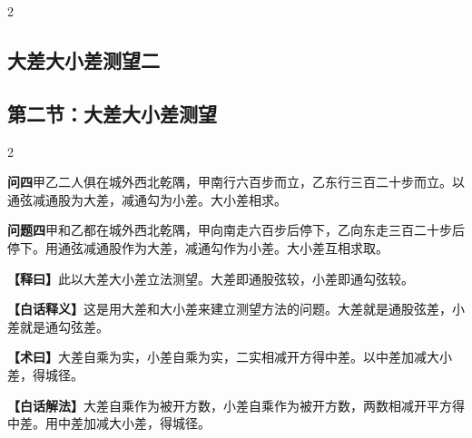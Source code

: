 \documentclass[11pt,a4paper]{article}
\newcommand{\WenQuestion}[1]{\textbf{\textcolor{classicalcolor}{#1}}}
\newcommand{\BaiQuestion}[1]{\textbf{\textcolor{moderncolor}{#1}}}
\newcommand{\WenExplain}{\textcolor{classicalcolor}{\textbf{【释曰】}}}
\newcommand{\BaiExplain}{\textcolor{moderncolor}{\textbf{【白话释义】}}}
\newcommand{\WenMethod}{\textcolor{classicalcolor}{\textbf{【术曰】}}}
\newcommand{\BaiMethod}{\textcolor{moderncolor}{\textbf{【白话解法】}}}
\begin{document}
\vspace{0.5em}

\begin{paracol}{2}
\subsection*{\textcolor{sectioncolor}{大差大小差测望二}}
\switchcolumn
\subsection*{\textcolor{sectioncolor}{第二节：大差大小差测望}}
\end{paracol}

\vspace{0.5em}

\begin{paracol}{2}

\switchcolumn*
\begin{tcolorbox}[colback=red!3,colframe=red!30!black,boxrule=0.3pt]
\WenQuestion{问四}\quad 甲乙二人俱在城外西北乾隅，甲南行六百步而立，乙东行三百二十步而立。以通弦减通股为大差，减通勾为小差。大小差相求。
\end{tcolorbox}
\switchcolumn
\begin{tcolorbox}[colback=blue!3,colframe=blue!30!black,boxrule=0.3pt]
\BaiQuestion{问题四}\quad 甲和乙都在城外西北乾隅，甲向南走六百步后停下，乙向东走三百二十步后停下。用通弦减通股作为大差，减通勾作为小差。大小差互相求取。
\end{tcolorbox}

\switchcolumn*
\begin{tcolorbox}[colback=red!5,colframe=red!30!black,boxrule=0.3pt]
\WenExplain\quad 此以大差大小差立法测望。大差即通股弦较，小差即通勾弦较。
\end{tcolorbox}
\switchcolumn
\begin{tcolorbox}[colback=blue!5,colframe=blue!30!black,boxrule=0.3pt]
\BaiExplain\quad 这是用大差和大小差来建立测望方法的问题。大差就是通股弦差，小差就是通勾弦差。
\end{tcolorbox}

\switchcolumn*
\begin{tcolorbox}[colback=red!5,colframe=red!40!black,boxrule=0.3pt]
\WenMethod\quad 大差自乘为实，小差自乘为实，二实相减开方得中差。以中差加减大小差，得城径。
\end{tcolorbox}
\switchcolumn
\begin{tcolorbox}[colback=blue!5,colframe=blue!40!black,boxrule=0.3pt]
\BaiMethod\quad 大差自乘作为被开方数，小差自乘作为被开方数，两数相减开平方得中差。用中差加减大小差，得城径。
\end{tcolorbox}


\end{paracol}
\end{document}
